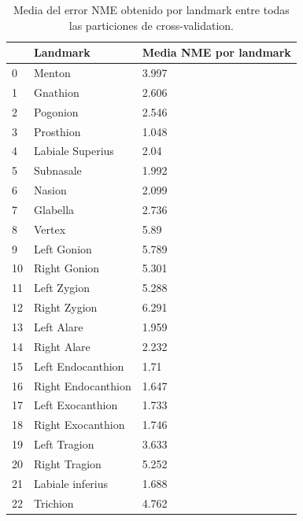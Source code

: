             \begin{table}[!ht]
                \centering
                \caption{Media del error NME obtenido por landmark entre todas las particiones de cross-validation.}
                \begin{tabular}{|l|l|l|}
                \hline
                    ~ & Landmark & Media NME por landmark \\ \hline
                    0 & Menton & 3.997 \\ \hline
                    1 & Gnathion & 2.606 \\ \hline
                    2 & Pogonion & 2.546 \\ \hline
                    3 & Prosthion & 1.048 \\ \hline
                    4 & Labiale Superius & 2.04 \\ \hline
                    5 & Subnasale & 1.992 \\ \hline
                    6 & Nasion & 2.099 \\ \hline
                    7 & Glabella & 2.736 \\ \hline
                    8 & Vertex & 5.89 \\ \hline
                    9 & Left Gonion & 5.789 \\ \hline
                    10 & Right Gonion & 5.301 \\ \hline
                    11 & Left Zygion & 5.288 \\ \hline
                    12 & Right Zygion & 6.291 \\ \hline
                    13 & Left Alare & 1.959 \\ \hline
                    14 & Right Alare & 2.232 \\ \hline
                    15 & Left Endocanthion & 1.71 \\ \hline
                    16 & Right Endocanthion & 1.647 \\ \hline
                    17 & Left Exocanthion & 1.733 \\ \hline
                    18 & Right Exocanthion & 1.746 \\ \hline
                    19 & Left Tragion & 3.633 \\ \hline
                    20 & Right Tragion & 5.252 \\ \hline
                    21 & Labiale inferius & 1.688 \\ \hline
                    22 & Trichion & 4.762 \\ \hline

\end{tabular}
\end{table}
